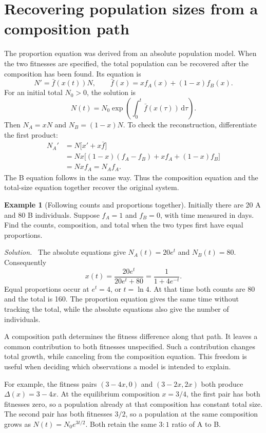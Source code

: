 \documentclass[11pt,oneside,openany]{book}
\theoremstyle{definition}
\newtheorem{example}{Example}[chapter]
\theoremstyle{remark}
\newenvironment{solution}{\par\smallskip\noindent\textit{Solution.}\ }{\par\smallskip}
\newcommand{\dd}{\,\mathrm{d}}
\numberwithin{equation}{chapter}
\begin{document}
\section{Recovering population sizes from a composition path}
The proportion equation was derived from an absolute population model. When the two fitnesses are specified, the total population can be recovered after the composition has been found. Its equation is
\[
N'=\bar f(x(t))N,\qquad
\bar f(x)=xf_A(x)+(1-x)f_B(x).
\]
For an initial total $N_0>0$, the solution is
\[
N(t)=N_0\exp\left(\int_0^t\bar f(x(\tau))\dd\tau\right).
\]
Then $N_A=xN$ and $N_B=(1-x)N$. To check the reconstruction, differentiate the first product:
\begin{align*}
N_A'&=N\bigl[x'+x\bar f\bigr]\\
&=Nx\bigl[(1-x)(f_A-f_B)+xf_A+(1-x)f_B\bigr]\\
&=Nx f_A=N_Af_A.
\end{align*}
The B equation follows in the same way. Thus the composition equation and the total-size equation together recover the original system.

\begin{example}[Following counts and proportions together]
Initially there are 20 A and 80 B individuals. Suppose $f_A=1$ and $f_B=0$, with time measured in days. Find the counts, composition, and total when the two types first have equal proportions.
\begin{solution}
The absolute equations give $N_A(t)=20e^t$ and $N_B(t)=80$. Consequently
\[
x(t)=\frac{20e^t}{20e^t+80}=\frac1{1+4e^{-t}}.
\]
Equal proportions occur at $e^t=4$, or $t=\ln4$. At that time both counts are 80 and the total is 160. The proportion equation gives the same time without tracking the total, while the absolute equations also give the number of individuals.
\end{solution}
\end{example}

A composition path determines the fitness difference along that path. It leaves a common contribution to both fitnesses unspecified. Such a contribution changes total growth, while canceling from the composition equation. This freedom is useful when deciding which observations a model is intended to explain.

For example, the fitness pairs $(3-4x,0)$ and $(3-2x,2x)$ both produce $\Delta(x)=3-4x$. At the equilibrium composition $x=3/4$, the first pair has both fitnesses zero, so a population already at that composition has constant total size. The second pair has both fitnesses $3/2$, so a population at the same composition grows as $N(t)=N_0e^{3t/2}$. Both retain the same $3:1$ ratio of A to B.
\end{document}

